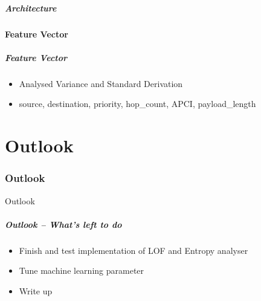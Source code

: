 \begin{frame}[c]
	\frametitle{Architecture}
	
	
	\note{
	}
\end{frame}


\subsection{Feature Vector}
\begin{frame}[c]
	\frametitle{Feature Vector}
	
	\begin{itemize}
		\item Analysed Variance and Standard Derivation
		\item source, destination, priority, hop\_count, APCI, payload\_length
	\end{itemize}
\end{frame}


\part{Outlook}
\label{part:outlook}

\section{Outlook}
\begin{frame}[c]
	\centering
	\LARGE Outlook
\end{frame}

\begin{frame}[c]
	\frametitle{Outlook -- What's left to do}
	\begin{itemize}
		\item Finish and test implementation of LOF and Entropy analyser
		\item Tune machine learning parameter
		\item Write up
	\end{itemize}
\end{frame}
